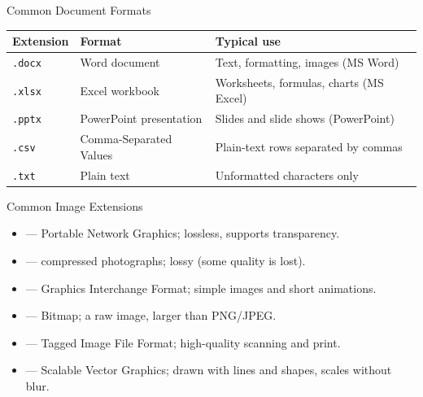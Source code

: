 \documentclass[aspectratio=169]{beamer}
\begin{document}
\begin{frame}{Common Document Formats}
  \begin{center}
    \begin{tabular}{p{}p{}p{}}
      \toprule
      \textbf{Extension} & \textbf{Format} & \textbf{Typical use} \\
      \midrule
      \texttt{.docx} & Word document & Text, formatting, images (MS Word) \\
      \texttt{.xlsx} & Excel workbook & Worksheets, formulas, charts (MS Excel) \\
      \texttt{.pptx} & PowerPoint presentation & Slides and slide shows (PowerPoint) \\
      \texttt{.csv} & Comma-Separated Values & Plain-text rows separated by commas \\
      \texttt{.txt} & Plain text & Unformatted characters only \\
      \bottomrule
    \end{tabular}
  \end{center}
  \vspace{0.2cm}
\end{frame}

\begin{frame}{Common Image Extensions}
  \begin{itemize}
    \item {} --- Portable Network Graphics; lossless, supports
      transparency.
    \item {} --- compressed photographs; lossy (some quality
      is lost).
    \item {} --- Graphics Interchange Format; simple images and short
      animations.
    \item {} --- Bitmap; a raw image, larger than PNG/JPEG.
    \item {} --- Tagged Image File Format; high-quality scanning and
      print.
    \item {} --- Scalable Vector Graphics; drawn with lines and
      shapes, scales without blur.
  \end{itemize}
\end{frame}
\end{document}
